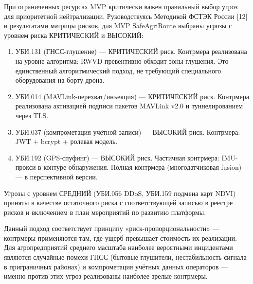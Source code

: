 \documentclass[14pt,a4paper]{extarticle}
\begin{document}
При ограниченных ресурсах MVP критически важен правильный выбор угроз для приоритетной нейтрализации. Руководствуясь Методикой ФСТЭК России {[}12{]} и результатами матрицы рисков, для MVP SafeAgriRoute выбраны угрозы с уровнем риска КРИТИЧЕСКИЙ и ВЫСОКИЙ:

\begin{enumerate}
\def\labelenumi{\arabic{enumi}.}
\item
  УБИ.131 (ГНСС-глушение) --- КРИТИЧЕСКИЙ риск. Контрмера реализована на уровне алгоритма: RWVD превентивно обходит зоны глушения. Это единственный алгоритмический подход, не требующий специального оборудования на борту дрона.
\item
  УБИ.014 (MAVLink-перехват/инъекция) --- КРИТИЧЕСКИЙ риск. Контрмера реализована активацией подписи пакетов MAVLink v2.0 и туннелированием через TLS.
\item
  УБИ.037 (компрометация учётной записи) --- ВЫСОКИЙ риск. Контрмера: JWT + bcrypt + ролевая модель.
\item
  УБИ.192 (GPS-спуфинг) --- ВЫСОКИЙ риск. Частичная контрмера: IMU-прокси в контуре обнаружения. Полная контрмера (многодатчиковая fusion) --- в перспективной версии.
\end{enumerate}

Угрозы с уровнем СРЕДНИЙ (УБИ.056 DDoS, УБИ.159 подмена карт NDVI) приняты в качестве остаточного риска с соответствующей записью в реестре рисков и включением в план мероприятий по развитию платформы.

Данный подход соответствует принципу «риск-пропорциональности» --- контрмеры применяются там, где ущерб превышает стоимость их реализации. Для агропредприятий среднего масштаба наиболее вероятными инцидентами являются случайные помехи ГНСС (бытовые глушители, нестабильность сигнала в приграничных районах) и компрометация учётных данных операторов --- именно против этих угроз реализованы наиболее зрелые контрмеры.
\end{document}
